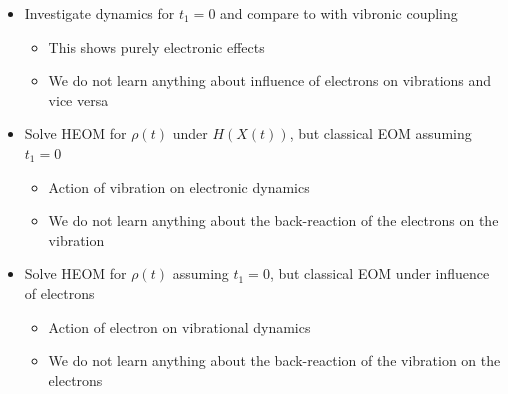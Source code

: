 \documentclass{article}
\begin{document}
\begin{itemize}
	\item Investigate dynamics for $t_1=0$ and compare to with vibronic coupling
	\begin{itemize}
		\item This shows purely electronic effects
		\item We do not learn anything about influence of electrons on vibrations and vice versa
	\end{itemize}
	\item Solve HEOM for $\rho(t)$ under $H(X(t))$, but classical EOM assuming $t_1=0$
	\begin{itemize}
		\item Action of vibration on electronic dynamics
		\item We do not learn anything about the back-reaction of the electrons on the vibration
	\end{itemize}
	\item Solve HEOM for $\rho(t)$ assuming $t_1 = 0$, but classical EOM under influence of electrons
	\begin{itemize}
		\item Action of electron on vibrational dynamics 
		\item We do not learn anything about the back-reaction of the vibration on the electrons
	\end{itemize}
\end{itemize}
\end{document}
